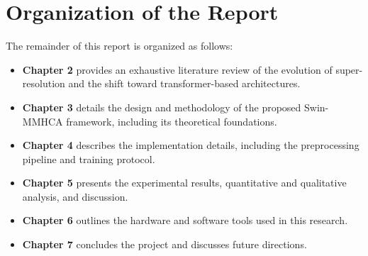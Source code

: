 \section{Organization of the Report}
The remainder of this report is organized as follows:
\begin{itemize}
    \item \textbf{Chapter 2} provides an exhaustive literature review of the evolution of super-resolution and the shift toward transformer-based architectures.
    \item \textbf{Chapter 3} details the design and methodology of the proposed Swin-MMHCA framework, including its theoretical foundations.
    \item \textbf{Chapter 4} describes the implementation details, including the preprocessing pipeline and training protocol.
    \item \textbf{Chapter 5} presents the experimental results, quantitative and qualitative analysis, and discussion.
    \item \textbf{Chapter 6} outlines the hardware and software tools used in this research.
    \item \textbf{Chapter 7} concludes the project and discusses future directions.
\end{itemize}
